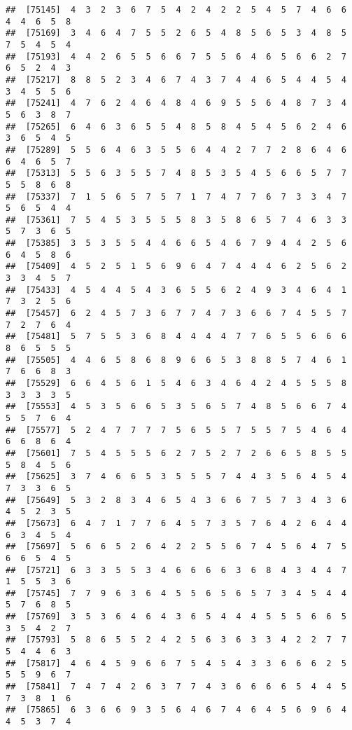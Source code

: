 \documentclass[
]{book}
\begin{document}
\begin{verbatim}
##  [75145]  4  3  2  3  6  7  5  4  2  4  2  2  5  4  5  7  4  6  6  4  4  6  5  8
##  [75169]  3  4  6  4  7  5  5  2  6  5  4  8  5  6  5  3  4  8  5  7  5  4  5  4
##  [75193]  4  4  2  6  5  5  6  6  7  5  5  6  4  6  5  6  6  2  7  6  5  2  4  3
##  [75217]  8  8  5  2  3  4  6  7  4  3  7  4  4  6  5  4  4  5  4  3  4  5  5  6
##  [75241]  4  7  6  2  4  6  4  8  4  6  9  5  5  6  4  8  7  3  4  5  6  3  8  7
##  [75265]  6  4  6  3  6  5  5  4  8  5  8  4  5  4  5  6  2  4  6  3  6  5  4  5
##  [75289]  5  5  6  4  6  3  5  5  6  4  4  2  7  7  2  8  6  4  6  6  4  6  5  7
##  [75313]  5  5  6  3  5  5  7  4  8  5  3  5  4  5  6  6  5  7  7  5  5  8  6  8
##  [75337]  7  1  5  6  5  7  5  7  1  7  4  7  7  6  7  3  3  4  7  5  6  5  4  4
##  [75361]  7  5  4  5  3  5  5  5  8  3  5  8  6  5  7  4  6  3  3  5  7  3  6  5
##  [75385]  3  5  3  5  5  4  4  6  6  5  4  6  7  9  4  4  2  5  6  6  4  5  8  6
##  [75409]  4  5  2  5  1  5  6  9  6  4  7  4  4  4  6  2  5  6  2  3  3  4  5  7
##  [75433]  4  5  4  4  5  4  3  6  5  5  6  2  4  9  3  4  6  4  1  7  3  2  5  6
##  [75457]  6  2  4  5  7  3  6  7  7  4  7  3  6  6  7  4  5  5  7  7  2  7  6  4
##  [75481]  5  7  5  5  3  6  8  4  4  4  4  7  7  6  5  5  6  6  6  8  6  5  5  5
##  [75505]  4  4  6  5  8  6  8  9  6  6  5  3  8  8  5  7  4  6  1  7  6  6  8  3
##  [75529]  6  6  4  5  6  1  5  4  6  3  4  6  4  2  4  5  5  5  8  3  3  3  3  5
##  [75553]  4  5  3  5  6  6  5  3  5  6  5  7  4  8  5  6  6  7  4  5  5  7  6  4
##  [75577]  5  2  4  7  7  7  7  5  6  5  5  7  5  5  7  5  4  6  4  6  6  8  6  4
##  [75601]  7  5  4  5  5  5  6  2  7  5  2  7  2  6  6  5  8  5  5  5  8  4  5  6
##  [75625]  3  7  4  6  6  5  3  5  5  5  7  4  4  3  5  6  4  5  4  7  3  3  6  5
##  [75649]  5  3  2  8  3  4  6  5  4  3  6  6  7  5  7  3  4  3  6  4  5  2  3  5
##  [75673]  6  4  7  1  7  7  6  4  5  7  3  5  7  6  4  2  6  4  4  6  3  4  5  4
##  [75697]  5  6  6  5  2  6  4  2  2  5  5  6  7  4  5  6  4  7  5  6  6  5  4  5
##  [75721]  6  3  3  5  5  3  4  6  6  6  6  3  6  8  4  3  4  4  7  1  5  5  3  6
##  [75745]  7  7  9  6  3  6  4  5  5  6  5  6  5  7  3  4  5  4  4  5  7  6  8  5
##  [75769]  3  5  3  6  4  6  4  3  6  5  4  4  4  5  5  5  6  6  5  3  5  4  2  7
##  [75793]  5  8  6  5  5  2  4  2  5  6  3  6  3  3  4  2  2  7  7  5  4  4  6  3
##  [75817]  4  6  4  5  9  6  6  7  5  4  5  4  3  3  6  6  6  2  5  5  5  9  6  7
##  [75841]  7  4  7  4  2  6  3  7  7  4  3  6  6  6  6  5  4  4  5  7  3  8  1  6
##  [75865]  6  3  6  6  9  3  5  6  4  6  7  4  6  4  5  6  9  6  4  4  5  3  7  4

\end{verbatim}
\end{document}
